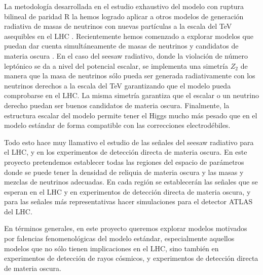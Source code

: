 \begin{darkmatter}
  La metodología desarrollada en el estudio exhaustivo del modelo con
  ruptura bilineal de paridad R la hemos logrado aplicar a otros
  modelos de generación radiativa de masas de neutrinos con nuevas
  partículas a la escala del TeV asequibles en el LHC
  \cite{Sierra:2008wj,AristizabalSierra:2006ri}. Recientemente hemos
  comenzado a explorar modelos que puedan dar cuenta simultáneamente
  de masas de neutrinos y candidatos de materia oscura
  \cite{Hirsch:2005ag,Choi:2010jt,Sierra:2008wj}. En el caso del
  seesaw radiativo, donde la violación de número leptónico se da a
  nivel del potencial escalar, se implementa una simetría $Z_2$ de
  manera que la masa de neutrinos sólo pueda ser generada
  radiativamente con los neutrinos derechos a la escala del TeV
  garantizando que el modelo pueda comprobarse en el LHC. La misma
  simetría garantiza que el escalar o un neutrino derecho puedan ser
  buenos candidatos de materia oscura. Finalmente, la estructura
  escalar del modelo permite tener el Higgs mucho más pesado que en el
  modelo estándar de forma compatible con las correcciones
  electrodébiles.


\begin{proyecto}
  Todo esto hace muy llamativo el estudio de las señales del seesaw
  radiativo para el LHC, y en los experimentos de detección directa de
  materia oscura. En este proyecto pretendemos establecer todas las
  regiones del espacio de parámetros donde se puede tener la densidad
  de reliquia de materia oscura y las masas y mezclas de neutrinos
  adecuadas. En cada región se establecerán las señales que se esperan
  en el LHC y en experimentos de detección directa de materia oscura,
  y para las señales más representativas hacer simulaciones para el
  detector ATLAS del LHC.
\end{proyecto}
\end{darkmatter}


\begin{proyecto}
  En términos generales, en este proyecto queremos explorar modelos
  motivados por falencias fenomenológicas del modelo estándar,
  especialmente aquellos modelos que no sólo tienen implicaciones en
  el LHC, sino también en experimentos de detección de rayos cósmicos,
  y experimentos de detección directa de materia oscura.
\end{proyecto}


